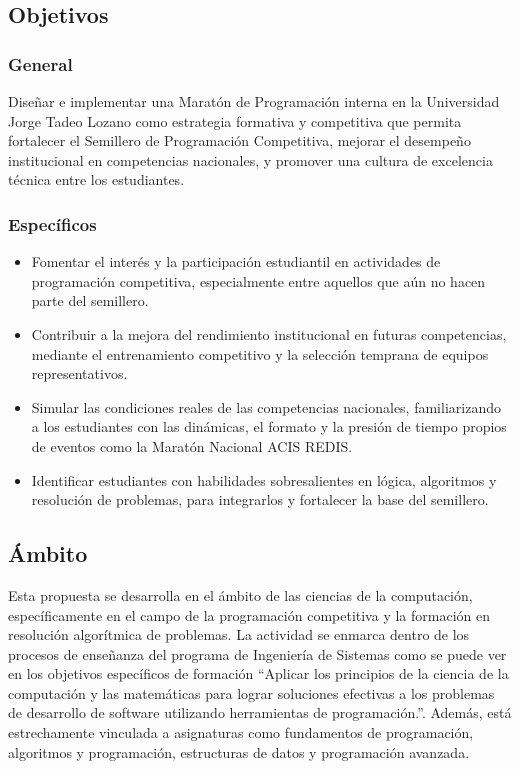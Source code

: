 \documentclass{article}
\begin{document}
\subsection{Objetivos}

\subsubsection{General}

Diseñar e implementar una Maratón de Programación interna en la Universidad Jorge Tadeo Lozano como estrategia formativa y competitiva que permita fortalecer el Semillero de Programación Competitiva, mejorar el desempeño institucional en competencias nacionales, y promover una cultura de excelencia técnica entre los estudiantes.

\subsubsection{Específicos}

\begin{itemize}
  \item Fomentar el interés y la participación estudiantil en actividades de programación competitiva, especialmente entre aquellos que aún no hacen parte del semillero.
  \item Contribuir a la mejora del rendimiento institucional en futuras competencias, mediante el entrenamiento competitivo y la selección temprana de equipos representativos.
  \item Simular las condiciones reales de las competencias nacionales, familiarizando a los estudiantes con las dinámicas, el formato y la presión de tiempo propios de eventos como la Maratón Nacional ACIS REDIS.
  \item Identificar estudiantes con habilidades sobresalientes en lógica, algoritmos y resolución de problemas, para integrarlos y fortalecer la base del semillero.
\end{itemize}


\subsection{Ámbito}


Esta propuesta se desarrolla en el ámbito de las ciencias de la computación, específicamente en el campo de la programación competitiva y la formación en resolución algorítmica de problemas. La actividad se enmarca dentro de los procesos de enseñanza del programa de Ingeniería de Sistemas como se puede ver en los objetivos específicos de formación ``Aplicar los principios de la ciencia de la computación y las matemáticas para lograr soluciones efectivas a los problemas de desarrollo de software utilizando herramientas de programación.''\cite{utadeo_sistemas}. Además, está estrechamente vinculada a asignaturas como fundamentos de programación, algoritmos y programación, estructuras de datos y programación avanzada.
\end{document}
